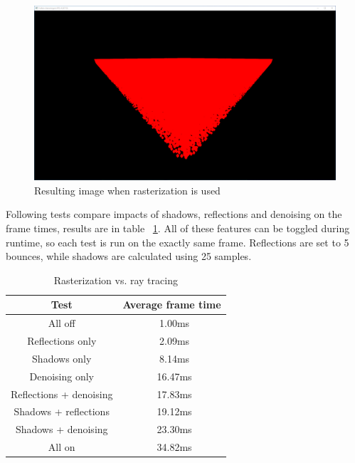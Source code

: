 \documentclass[times, utf8, zavrsni, numeric]{fer}
\begin{document}
\begin{center}
\begin{figure}[H]
\includegraphics[width=1\textwidth]{tests/raster_simple.png}
\caption{Resulting image when rasterization is used}
\end{figure}
\end{center}

Following tests compare impacts of shadows, reflections and denoising on the frame times, results are in table ~\ref{table:real_test}. All of these features can be toggled during runtime, so each test is run on the exactly same frame.
Reflections are set to 5 bounces, while shadows are calculated using 25 samples.
\begin{table}[H]
\caption{Rasterization vs. ray tracing}
\begin{center}
\begin{tabular}{|c|c|}
\hline
Test & Average frame time \\
\hline
All off & ~1.00ms \\
\hline
Reflections only & ~2.09ms \\
\hline
Shadows only & ~8.14ms \\
\hline
Denoising only & ~16.47ms \\
\hline
Reflections + denoising & ~17.83ms \\
\hline
Shadows + reflections & ~19.12ms \\
\hline
Shadows + denoising & ~23.30ms \\
\hline
All on & ~34.82ms \\
\hline
\end{tabular}
\label{table:real_test}
\end{center}
\end{table}
\end{document}
